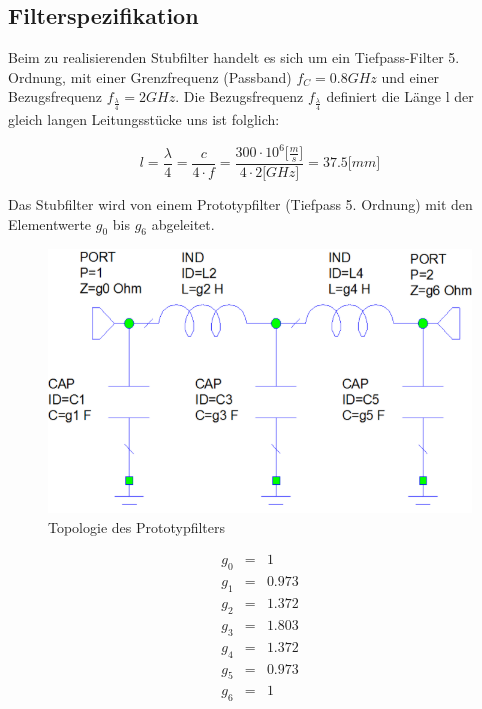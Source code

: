\subsection{Filterspezifikation}

Beim zu realisierenden Stubfilter handelt es sich um ein Tiefpass-Filter 5. Ordnung, mit einer Grenzfrequenz (Passband) $f_C = 0.8GHz $ und einer Bezugsfrequenz $f_{\frac{\lambda}{4}} = 2GHz$. Die Bezugsfrequenz $f_{\frac{\lambda}{4}}$ definiert die Länge l der gleich langen Leitungsstücke uns ist folglich:

\begin{equation*}
l = \frac{\lambda}{4} = \frac{c}{4 \cdot f} = \frac{300\cdot 10^6 \lbrack\frac{m}{s}\rbrack}{4 \cdot 2 \lbrack GHz \rbrack} =37.5 \lbrack mm \rbrack
\end{equation*}

Das Stubfilter wird von einem Prototypfilter (Tiefpass 5. Ordnung) 
mit den Elementwerte $g_0$ bis $g_6$ abgeleitet.

\begin{figure}[h!]
\centering
 	\includegraphics[width=\imagewidth]{images/Topologie_Prototyp.png}
 	\caption{Topologie des Prototypfilters}
 	\label{fig:Topologie_Prototyp.png}
\end{figure}

\begin{mdframed}
\begin{equation*} 
\begin{array}{rclcl} 
g_0 & = & 1 \\ 
g_1 & = & 0.973 \\ 
g_2 & = & 1.372 \\ 
g_3 & = & 1.803 \\ 
g_4 & = & 1.372 \\ 
g_5 & = & 0.973 \\ 
g_6 & = & 1 \\ 
\end{array} 
\end{equation*} 
\end{mdframed}

